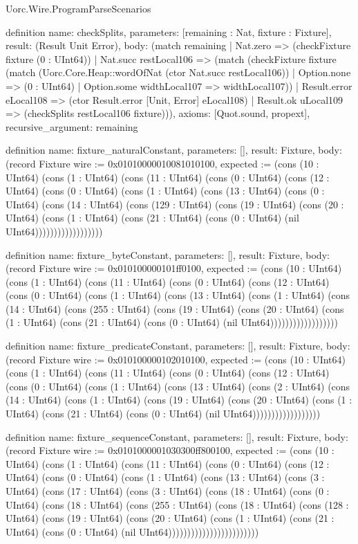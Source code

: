 \begin{lexlean}{Uorc.Wire.ProgramParseScenarios}
\begin{semanticmodule}
definition{
  name: checkSplits,
  parameters: [remaining : Nat, fixture : Fixture],
  result: (Result Unit Error),
  body: (match remaining
    | Nat.zero => (checkFixture fixture (0 : UInt64))
    | Nat.succ restLocal106 => (match (checkFixture fixture (match (Uorc.Core.Heap::wordOfNat (ctor Nat.succ restLocal106))
        | Option.none => (0 : UInt64)
        | Option.some widthLocal107 => widthLocal107))
      | Result.error eLocal108 => (ctor Result.error [Unit, Error] eLocal108)
      | Result.ok uLocal109 => (checkSplits restLocal106 fixture))),
  axioms: [Quot.sound, propext],
  recursive_argument: remaining
}

definition{
  name: fixture_naturalConstant,
  parameters: [],
  result: Fixture,
  body: (record Fixture {wire := 0x01010000010081010100, expected := (cons (10 : UInt64) (cons (1 : UInt64) (cons (11 : UInt64) (cons (0 : UInt64) (cons (12 : UInt64) (cons (0 : UInt64) (cons (1 : UInt64) (cons (13 : UInt64) (cons (0 : UInt64) (cons (14 : UInt64) (cons (129 : UInt64) (cons (19 : UInt64) (cons (20 : UInt64) (cons (1 : UInt64) (cons (21 : UInt64) (cons (0 : UInt64) (nil UInt64)))))))))))))))))})
}

definition{
  name: fixture_byteConstant,
  parameters: [],
  result: Fixture,
  body: (record Fixture {wire := 0x010100000101ff0100, expected := (cons (10 : UInt64) (cons (1 : UInt64) (cons (11 : UInt64) (cons (0 : UInt64) (cons (12 : UInt64) (cons (0 : UInt64) (cons (1 : UInt64) (cons (13 : UInt64) (cons (1 : UInt64) (cons (14 : UInt64) (cons (255 : UInt64) (cons (19 : UInt64) (cons (20 : UInt64) (cons (1 : UInt64) (cons (21 : UInt64) (cons (0 : UInt64) (nil UInt64)))))))))))))))))})
}

definition{
  name: fixture_predicateConstant,
  parameters: [],
  result: Fixture,
  body: (record Fixture {wire := 0x010100000102010100, expected := (cons (10 : UInt64) (cons (1 : UInt64) (cons (11 : UInt64) (cons (0 : UInt64) (cons (12 : UInt64) (cons (0 : UInt64) (cons (1 : UInt64) (cons (13 : UInt64) (cons (2 : UInt64) (cons (14 : UInt64) (cons (1 : UInt64) (cons (19 : UInt64) (cons (20 : UInt64) (cons (1 : UInt64) (cons (21 : UInt64) (cons (0 : UInt64) (nil UInt64)))))))))))))))))})
}

definition{
  name: fixture_sequenceConstant,
  parameters: [],
  result: Fixture,
  body: (record Fixture {wire := 0x0101000001030300ff800100, expected := (cons (10 : UInt64) (cons (1 : UInt64) (cons (11 : UInt64) (cons (0 : UInt64) (cons (12 : UInt64) (cons (0 : UInt64) (cons (1 : UInt64) (cons (13 : UInt64) (cons (3 : UInt64) (cons (17 : UInt64) (cons (3 : UInt64) (cons (18 : UInt64) (cons (0 : UInt64) (cons (18 : UInt64) (cons (255 : UInt64) (cons (18 : UInt64) (cons (128 : UInt64) (cons (19 : UInt64) (cons (20 : UInt64) (cons (1 : UInt64) (cons (21 : UInt64) (cons (0 : UInt64) (nil UInt64)))))))))))))))))))))))})
}


\end{semanticmodule}
\end{lexlean}
